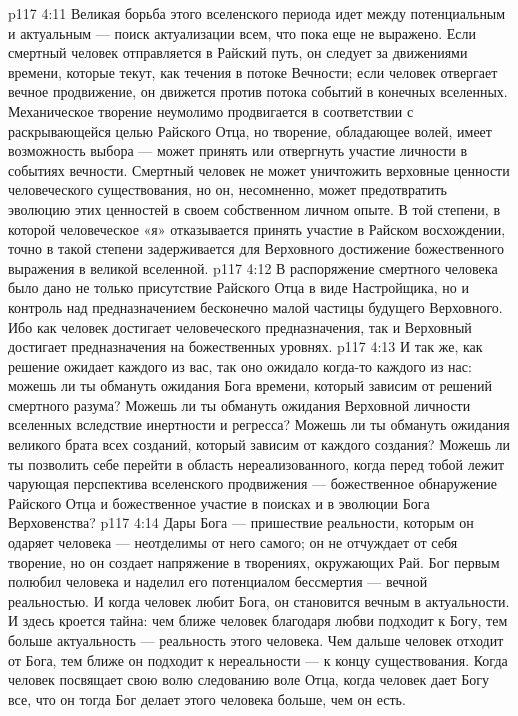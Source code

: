 \vs p117 4:11 \pc Великая борьба этого вселенского периода идет между потенциальным и актуальным --- поиск актуализации всем, что пока еще не выражено. Если смертный человек отправляется в Райский путь, он следует за движениями времени, которые текут, как течения в потоке Вечности; если человек отвергает вечное продвижение, он движется против потока событий в конечных вселенных. Механическое творение неумолимо продвигается в соответствии с раскрывающейся целью Райского Отца, но творение, обладающее волей, имеет возможность выбора --- может принять или отвергнуть участие личности в событиях вечности. Смертный человек не может уничтожить верховные ценности человеческого существования, но он, несомненно, может предотвратить эволюцию этих ценностей в своем собственном личном опыте. В той степени, в которой человеческое «я» отказывается принять участие в Райском восхождении, точно в такой степени задерживается для Верховного достижение божественного выражения в великой вселенной.
\vs p117 4:12 В распоряжение смертного человека было дано не только присутствие Райского Отца в виде Настройщика, но и контроль над предназначением бесконечно малой частицы будущего Верховного. Ибо как человек достигает человеческого предназначения, так и Верховный достигает предназначения на божественных уровнях.
\vs p117 4:13 И так же, как решение ожидает каждого из вас, так оно ожидало когда\hyp{}то каждого из нас: можешь ли ты обмануть ожидания Бога времени, который зависим от решений смертного разума? Можешь ли ты обмануть ожидания Верховной личности вселенных вследствие инертности и регресса? Можешь ли ты обмануть ожидания великого брата всех созданий, который зависим от каждого создания? Можешь ли ты позволить себе перейти в область нереализованного, когда перед тобой лежит чарующая перспектива вселенского продвижения --- божественное обнаружение Райского Отца и божественное участие в поисках и в эволюции Бога Верховенства?
\vs p117 4:14 \pc Дары Бога --- пришествие реальности, которым он одаряет человека --- неотделимы от него самого; он не отчуждает от себя творение, но он создает напряжение в творениях, окружающих Рай. Бог первым полюбил человека и наделил его потенциалом бессмертия --- вечной реальностью. И когда человек любит Бога, он становится вечным в актуальности. И здесь кроется тайна: чем ближе человек благодаря любви подходит к Богу, тем больше актуальность --- реальность этого человека. Чем дальше человек отходит от Бога, тем ближе он подходит к нереальности --- к концу существования. Когда человек посвящает свою волю следованию воле Отца, когда человек дает Богу все, что он  тогда Бог делает этого человека больше, чем он есть.
